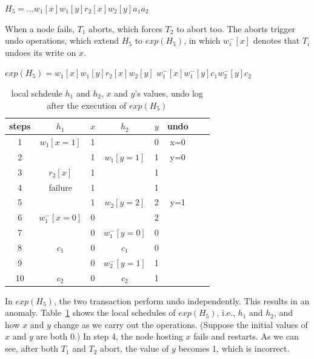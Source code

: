 \documentclass[conference]{IEEEtran}
\begin{document}
\begin{center}
${H_5 = ...w_1[x]w_1[y]r_2[x]w_2[y]a_1a_2}$
\end{center}

When a node fails, ${T_1}$ aborts, which forces ${T_2}$ to abort too.
The aborts trigger undo operations, which extend ${H_5}$ to ${exp(H_5)}$,
in which ${w^-_i[x]}$ denotes that ${T_i}$ undoes its write on ${x}$.

\begin{center}
  ${exp(H_5) =  w_1[x]w_1[y]r_2[x] w_2[y]}$
  ${w^-_1[x]w^-_1[y]  c_1 w^-_2[y]c_2}$
\end{center}


\begin{table}[tbp]
  \centering
  \caption{local schdeule $h_1$ and $h_2$, $x$ and $y$'s values, undo log after the execution of ${exp(H_5)}$}
  \begin{tabular}{|c|c|c|c|c|c|c|c|}
  \hline
steps & $h_1$ & $x$ & $h_2$ & $y$ & undo   \\
  \hline
  \hline
 1& $w_1[x=1]$ & 1 & &  0 & x=0  \\
  \hline
  2& & 1 & $w_1[y=1]$ & 1 & y=0   \\
  \hline
3 & $r_2[x]$ & 1 & & 1 &    \\

  \hline
 4 & failure  & 1 & & 1 &  \\
  \hline
 5& & 1 &   $w_2[y=2]$ & 2 & y=1  \\
  \hline
6  & $w^-_1[x=0]$ & 0 && 2 &   \\
  \hline
7 & & 0 & $w^-_1[y=0]$ & 0 &   \\
  \hline


8  & $c_1$ & 0 &$c_1$& 0 &   \\
  \hline
9 & & 0 &  $w^-_2[y=1]$& 1 &   \\
  \hline
10 & $c_2$ & 0 &$c_2$& 1 &  \\
  \hline
  \end{tabular}

\label{tbl:x_y_vlues}
\end{table}

In $exp(H_5)$, the two transaction perform undo independently. This results in an anomaly.
Table~\ref{tbl:x_y_vlues} shows the local schedules of $exp(H_5)$, i.e., ${h_1}$ and  ${h_2}$, and how ${x}$ and ${y}$ change as we carry out the operations.
(Suppose the initial values of ${x}$ and ${y}$ are both 0.)
In step 4, the node hosting ${x}$ fails and restarts.
As we can see, after both ${T_1}$ and ${T_2}$ abort, the value of ${y}$ becomes 1, which is incorrect.
\end{document}
